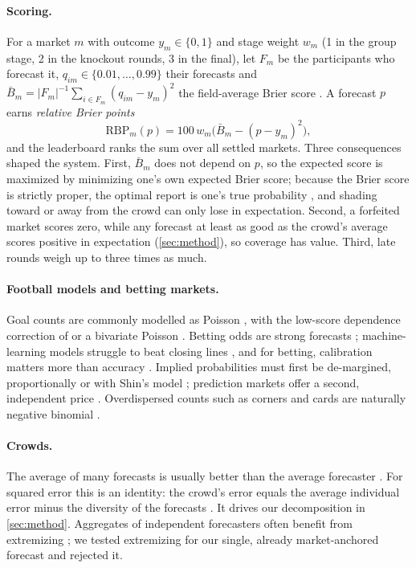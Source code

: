 \documentclass[11pt]{article}
\newcommand{\RBP}{\mathrm{RBP}}
\begin{document}
\paragraph{Scoring.}
For a market $m$ with outcome $y_m\in\{0,1\}$ and stage weight $w_m$ (1 in the group stage,
2 in the knockout rounds, 3 in the final), let $F_m$ be the participants who forecast it,
$q_{im}\in\{0.01,\dots,0.99\}$ their forecasts and
$\bar B_m = |F_m|^{-1}\sum_{i\in F_m}(q_{im}-y_m)^2$ the field-average Brier score
\citep{brier1950}. A forecast $p$ earns \emph{relative Brier points}
\begin{equation}\label{eq:rbp}
  \RBP_m(p) = 100\,w_m\bigl(\bar B_m - (p-y_m)^2\bigr),
\end{equation}
and the leaderboard ranks the sum over all settled markets. Three consequences shaped the
system. First, $\bar B_m$ does not depend on $p$, so the expected score is maximized by
minimizing one's own expected Brier score; because the Brier score is strictly proper, the
optimal report is one's true probability \citep{gneiting2007}, and shading toward or away from
the crowd can only lose in expectation. Second, a forfeited market scores zero, while any
forecast at least as good as the crowd's average scores positive in expectation
(\cref{sec:method}), so coverage has value. Third, late rounds weigh up to three times as much.

\paragraph{Football models and betting markets.}
Goal counts are commonly modelled as Poisson \citep{maher1982}, with the low-score dependence
correction of \citet{dixon1997} or a bivariate Poisson \citep{karlis2003}. Betting odds are
strong forecasts \citep{forrest2005, spann2009}; machine-learning models struggle to beat
closing lines \citep{hubacek2019}, and for betting, calibration matters more than accuracy
\citep{walsh2024}. Implied probabilities must first be de-margined, proportionally or with
Shin's model \citep{shin1993, strumbelj2014}; prediction markets offer a second, independent
price \citep{wolfers2004}. Overdispersed counts such as corners and cards are naturally
negative binomial \citep{cameron2013}.

\paragraph{Crowds.}
The average of many forecasts is usually better than the average forecaster \citep{galton1907}.
For squared error this is an identity: the crowd's error equals the average individual error
minus the diversity of the forecasts \citep{krogh1995, page2007}. It drives our decomposition in
\cref{sec:method}. Aggregates of independent forecasters often benefit from extremizing
\citep{baron2014, satopaa2014}; we tested extremizing for our single, already market-anchored
forecast and rejected it.
\end{document}
